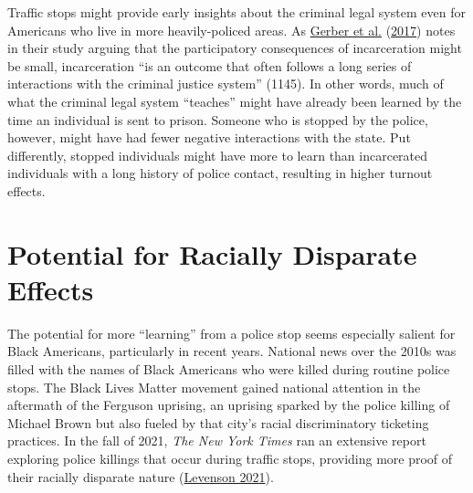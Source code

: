 \documentclass[
  12pt,
]{article}
\begin{document}
Traffic stops might provide early insights about the criminal legal system even for Americans who live in more heavily-policed areas. As \protect\hyperlink{ref-Gerber2017}{Gerber et al.} (\protect\hyperlink{ref-Gerber2017}{2017}) notes in their study arguing that the participatory consequences of incarceration might be small, incarceration ``is an outcome that often follows a long series of interactions with the criminal justice system'' (1145). In other words, much of what the criminal legal system ``teaches'' might have already been learned by the time an individual is sent to prison. Someone who is stopped by the police, however, might have had fewer negative interactions with the state. Put differently, stopped individuals might have more to learn than incarcerated individuals with a long history of police contact, resulting in higher turnout effects.

\hypertarget{potential-for-racially-disparate-effects}{%
\section*{Potential for Racially Disparate Effects}\label{potential-for-racially-disparate-effects}}

The potential for more ``learning'' from a police stop seems especially salient for Black Americans, particularly in recent years. National news over the 2010s was filled with the names of Black Americans who were killed during routine police stops. The Black Lives Matter movement gained national attention in the aftermath of the Ferguson uprising, an uprising sparked by the police killing of Michael Brown but also fueled by that city's racial discriminatory ticketing practices. In the fall of 2021, \emph{The New York Times} ran an extensive report exploring police killings that occur during traffic stops, providing more proof of their racially disparate nature (\protect\hyperlink{ref-Levenson2021}{Levenson 2021}).
\end{document}
